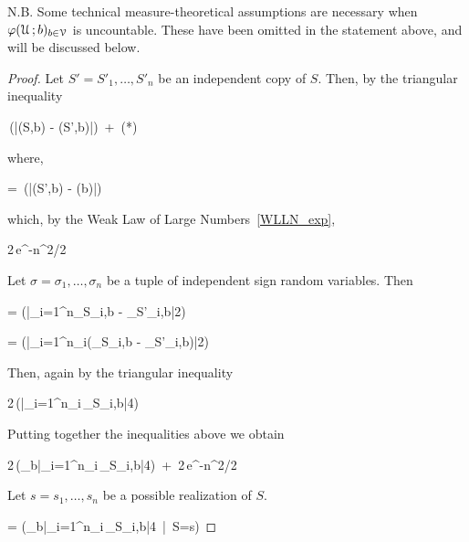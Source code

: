 \documentclass[scombinatorics.tex]{subfiles}
\begin{document}
N.B. Some technical measure-theoretical assumptions are necessary when $\varphi(\EuScript U\,;b)_{b\in\EuScript V}$ is uncountable.
These have been omitted in the statement above, and will be discussed below.

\begin{proof}
  Let $S'=S'_1,\dots,S'_n$ be an independent copy of $S$.
  Then, by the triangular inequality

  {\le}
  {\Pr\,\bigg(\big|\Fr(S,b) - \Fr(S',b)\big|\ge\frac{}\bigg)\ +\ (*)}

  where,

  \ceq{\hfill (*)}
  {=}
  {\Pr\,\bigg(\big|\Fr(S',b) - \Pr(b)\big|\ge\frac{}\bigg)}
 
 which, by the Weak Law of Large Numbers~\ref{WLLN_exp}, 
  
  \ceq{}
  {\le}
  {2\,e^{-n\epsilon^2/2}}

  Let $\sigma=\sigma_1,\dots,\sigma_n$ be a tuple of independent sign random variables.
  Then
  
  {=}
  {\Pr\bigg(\Big|\sum_{i=1}^n\Indicator_{S_i,b} - \Indicator_{S'_i,b}\Big|\ge{}2\bigg)}
  \smallskip
  

  \ceq{\hfill}
  {=}
  {\Pr\bigg(\Big|\sum_{i=1}^n\sigma_i\big(\Indicator_{S_i,b} - \Indicator_{S'_i,b}\big)\Big|\ge{}2\bigg)}
  \smallskip

  Then, again by the triangular inequality

  \ceq{}
  {\le}
  {2\,\Pr\bigg(\Big|\sum_{i=1}^n\sigma_i\,\Indicator_{S_i,b}\Big|\ge{}4\bigg)}

  Putting together the inequalities above we obtain\smallskip

  {\le}
  {2\,\Pr\bigg(\sup_{b\in\V}\Big|\sum_{i=1}^n\sigma_i\,\Indicator_{S_i,b}\Big|\ge{}4\bigg)\ +\ 2\,e^{-n\epsilon^2/2}}
  \smallskip

  Let $s=s_1,\dots,s_n$ be a possible realization of $S$.\smallskip

  {=}
  {\Pr\bigg(\sup_{b\in\V}\Big|\sum_{i=1}^n\sigma_i\,\Indicator_{S_i,b}\Big|\ge{}4\ \big|\  S=s\bigg)}
  \smallskip


\end{proof}
\end{document}
